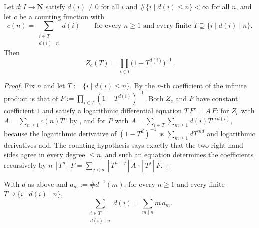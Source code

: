\begin{theorem}
  \label{thm:weil-counting-zeta-euler-product}
  \leanok

  Let $d\colon I\to\mathbf N$ satisfy $d(i)\ne 0$ for all $i$ and
  $\#\{i\mid d(i)\le n\}<\infty$ for all $n$, and let $c$ be a counting function
  with
  \[
    c(n)=\sum_{\substack{i\in T\\ d(i)\mid n}}d(i)
    \qquad\text{for every }n\ge 1
    \text{ and every finite }T\supseteq\{i\mid d(i)\mid n\}.
  \]
  Then
  \[
    Z_c(T)=\prod_{i\in I}\bigl(1-T^{d(i)}\bigr)^{-1}.
  \]
\end{theorem}

\begin{proof}
  \leanok
  Fix $n$ and let $T:=\{i\mid d(i)\le n\}$.  By
   the $n$-th coefficient of the
  infinite product is that of $P:=\prod_{i\in T}(1-T^{d(i)})^{-1}$.  Both $Z_c$
  and $P$ have constant coefficient $1$ and satisfy a logarithmic differential
  equation $T\,F'=A\,F$: for $Z_c$ with
  $A=\sum_{n\ge 1}c(n)T^n$ by
  , and for $P$ with
  $A=\sum_{i\in T}\sum_{m\ge 1}d(i)T^{m\,d(i)}$, because the logarithmic
  derivative of $(1-T^{d})^{-1}$ is $\sum_{m\ge 1}dT^{md}$ and logarithmic
  derivatives add.  The counting hypothesis says exactly that the two right
  hand sides agree in every degree $\le n$, and such an equation determines the
  coefficients recursively by $n\,[T^n]F=\sum_{j<n}[T^{n-j}]A\cdot[T^j]F$.
\end{proof}

\begin{lemma}
  \label{lemma:weil-degree-sum-eq-multiplicity-sum}
  \leanok

  With $d$ as above and $a_m:=\#d^{-1}(m)$, for every $n\ge 1$ and every finite
  $T\supseteq\{i\mid d(i)\mid n\}$,
  \[
    \sum_{\substack{i\in T\\ d(i)\mid n}}d(i)=\sum_{m\mid n}m\,a_m .
  \]
\end{lemma}

